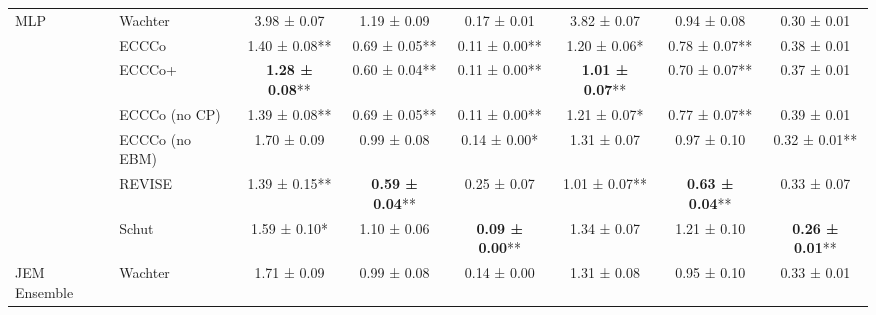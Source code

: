 \begin{table*}
{\begin{tabular}[t]{llcccccc}
\multirow{-7}{*}{\raggedright\arraybackslash MLP} & Wachter & 3.98 ± 0.07\hphantom{*}\hphantom{*} & 1.19 ± 0.09\hphantom{*}\hphantom{*} & 0.17 ± 0.01\hphantom{*}\hphantom{*} & 3.82 ± 0.07\hphantom{*}\hphantom{*} & 0.94 ± 0.08\hphantom{*}\hphantom{*} & 0.30 ± 0.01\hphantom{*}\hphantom{*}\\
\cmidrule{1-8}
 & ECCCo & 1.40 ± 0.08** & 0.69 ± 0.05** & 0.11 ± 0.00** & 1.20 ± 0.06*\hphantom{*} & 0.78 ± 0.07** & 0.38 ± 0.01\hphantom{*}\hphantom{*}\\

 & ECCCo+ & \textbf{1.28 ± 0.08}** & 0.60 ± 0.04** & 0.11 ± 0.00** & \textbf{1.01 ± 0.07}** & 0.70 ± 0.07** & 0.37 ± 0.01\hphantom{*}\hphantom{*}\\

 & ECCCo (no CP) & 1.39 ± 0.08** & 0.69 ± 0.05** & 0.11 ± 0.00** & 1.21 ± 0.07*\hphantom{*} & 0.77 ± 0.07** & 0.39 ± 0.01\hphantom{*}\hphantom{*}\\

 & ECCCo (no EBM) & 1.70 ± 0.09\hphantom{*}\hphantom{*} & 0.99 ± 0.08\hphantom{*}\hphantom{*} & 0.14 ± 0.00*\hphantom{*} & 1.31 ± 0.07\hphantom{*}\hphantom{*} & 0.97 ± 0.10\hphantom{*}\hphantom{*} & 0.32 ± 0.01**\\

 & REVISE & 1.39 ± 0.15** & \textbf{0.59 ± 0.04}** & 0.25 ± 0.07\hphantom{*}\hphantom{*} & 1.01 ± 0.07** & \textbf{0.63 ± 0.04}** & 0.33 ± 0.07\hphantom{*}\hphantom{*}\\

 & Schut & 1.59 ± 0.10*\hphantom{*} & 1.10 ± 0.06\hphantom{*}\hphantom{*} & \textbf{0.09 ± 0.00}** & 1.34 ± 0.07\hphantom{*}\hphantom{*} & 1.21 ± 0.10\hphantom{*}\hphantom{*} & \textbf{0.26 ± 0.01}**\\

\multirow{-7}{*}{\raggedright\arraybackslash JEM Ensemble} & Wachter & 1.71 ± 0.09\hphantom{*}\hphantom{*} & 0.99 ± 0.08\hphantom{*}\hphantom{*} & 0.14 ± 0.00\hphantom{*}\hphantom{*} & 1.31 ± 0.08\hphantom{*}\hphantom{*} & 0.95 ± 0.10\hphantom{*}\hphantom{*} & 0.33 ± 0.01\hphantom{*}\hphantom{*}\\
\bottomrule
\end{tabular}}
\end{table*}
